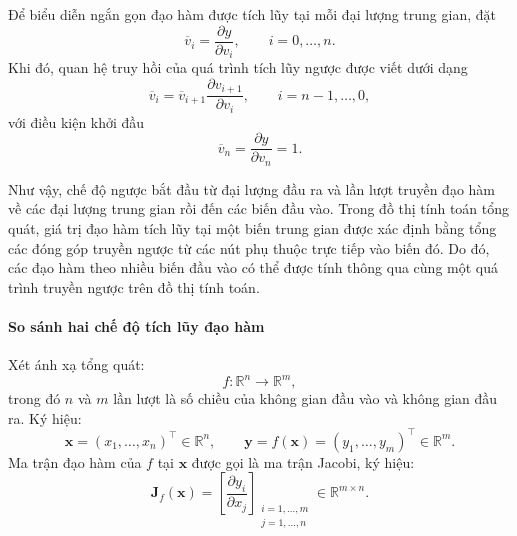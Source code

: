 \begin{itemize}
    Để biểu diễn ngắn gọn đạo hàm được tích lũy tại mỗi đại lượng trung gian, đặt
    \begin{equation}
    \overline{v}_i=\frac{\partial y}{\partial  v_i},\qquad i=0,\ldots,n.
    \end{equation}
    Khi đó, quan hệ truy hồi của quá trình tích lũy ngược được viết dưới dạng
    \begin{equation}
    \overline{v}_i=\overline{v}_{i+1}\frac{\partial v_{i+1}}{\partial v_i},\qquad i=n-1,\ldots,0,
    \end{equation}
    với điều kiện khởi đầu
    \begin{equation}
    \overline{v}_n=\frac{\partial y}{\partial v_n}=1.
    \end{equation}
\end{itemize}
Như vậy, chế độ ngược bắt đầu từ đại lượng đầu ra và lần lượt truyền đạo hàm về các đại lượng trung gian rồi đến các biến đầu vào. Trong đồ thị tính toán tổng quát, giá trị đạo hàm tích lũy tại một biến trung gian được xác định bằng tổng các đóng góp truyền ngược từ các nút phụ thuộc trực tiếp vào biến đó. Do đó, các đạo hàm theo nhiều biến đầu vào có thể được tính thông qua cùng một quá trình truyền ngược trên đồ thị tính toán.

\paragraph{So sánh hai chế độ tích lũy đạo hàm}

Xét ánh xạ tổng quát:
\begin{equation}
f: \mathbb{R}^n \rightarrow \mathbb{R}^m,
\end{equation}
trong đó $n$ và $m$ lần lượt là số chiều của không gian đầu vào và không gian đầu ra. Ký hiệu:
\begin{equation}
\mathbf{x} = (x_1, \dots, x_n)^{\top} \in \mathbb{R}^n, \qquad \mathbf{y} = f(\mathbf{x}) = (y_1, \dots, y_m)^{\top} \in \mathbb{R}^m.
\end{equation}
Ma trận đạo hàm của $f$ tại $\mathbf{x}$ được gọi là ma trận Jacobi, ký hiệu:
\begin{equation}
\mathbf{J}_f(\mathbf{x}) = \left[ \frac{\partial y_i}{\partial x_j} \right]_{\substack{i=1,\dots,m \\ j=1,\dots,n}} \in \mathbb{R}^{m \times n}.
\end{equation}

